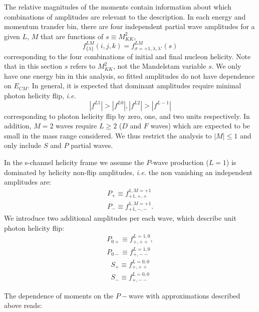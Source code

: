 \documentclass[twocolumn,superscriptaddress,prd]{revtex4}
\begin{document}
The relative magnitudes of the moments contain information about which combinations of amplitudes are relevant to the description. In each energy and momentum transfer bin, there are four independent partial wave amplitudes for a given $L$, $M$ that are functions of $s \equiv M_{KK}^2$,
\begin{equation}
f^{LM}_{\{\lambda\}}(i,j,k) = f^{LM}_{\sigma = +1,\lambda,\lambda'}(s)
\end{equation}
corresponding to the four combinations of initial and final nucleon helicity. Note that in this section $s$ refers to $M_{KK}^2$, not the Mandelstam variable $s$. We only have one energy bin in this analysis, so fitted amplitudes do not have dependence on $E_{CM}$. In general, it is expected that dominant amplitudes require minimal photon helicity flip, \textit{i.e.}
\begin{equation}
|f^{L1}| > |f^{L0}|, |f^{L2}| > |f^{L-1}|
 \end{equation}
 corresponding to photon helicity flip by zero, one, and two units respectively.   In addition, $M=2$ waves require $L \ge 2$ ($D$ and $F$ waves) which are expected to be small in the mass range considered. We thus restrict the analysis to $|M| \le 1$ and only include $S$ and $P$ partial waves.

In the s-channel helicity frame we assume the $P$-wave production ($L=1$) is dominated by helicity non-flip amplitudes, {\it i.e.} the non vanishing an independent amplitudes are:
\begin{eqnarray}
P_{+} \equiv f^{1,M=+1}_{+1,+,+}\\ \nonumber
P_{-} \equiv  f^{1,M=+1}_{+1,-,-}.
\end{eqnarray}
We introduce two additional amplitudes per each wave, which describe unit photon helicity flip:
\begin{eqnarray}
P_{0+} \equiv f^{L=1,0}_{+,++},\\ P_{0-} \equiv f^{L=1,0}_{+,--} 
\end{eqnarray}
\begin{eqnarray} 
S_{+} \equiv f^{L=0,0}_{+,++}\\ \nonumber
S_{-} \equiv f^{L=0,0}_{+,--} 
\end{eqnarray} 

The dependence of moments on the $P-$wave with approximations described above reads:
\end{document}
